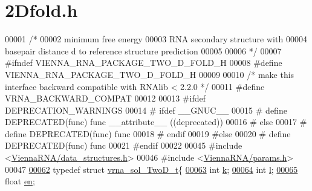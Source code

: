 \hypertarget{2Dfold_8h_source}{}\section{2\+Dfold.h}
\label{2Dfold_8h_source}

\begin{DoxyCode}
00001 \textcolor{comment}{/*}
00002 \textcolor{comment}{      minimum free energy}
00003 \textcolor{comment}{      RNA secondary structure with}
00004 \textcolor{comment}{      basepair distance d to reference structure prediction}
00005 \textcolor{comment}{}
00006 \textcolor{comment}{*/}
00007 \textcolor{preprocessor}{#ifndef VIENNA\_RNA\_PACKAGE\_TWO\_D\_FOLD\_H}
00008 \textcolor{preprocessor}{#define VIENNA\_RNA\_PACKAGE\_TWO\_D\_FOLD\_H}
00009 
00010 \textcolor{comment}{/* make this interface backward compatible with RNAlib < 2.2.0 */}
00011 \textcolor{preprocessor}{#define VRNA\_BACKWARD\_COMPAT}
00012 
00013 \textcolor{preprocessor}{#ifdef DEPRECATION\_WARNINGS}
00014 \textcolor{preprocessor}{# ifdef \_\_GNUC\_\_}
00015 \textcolor{preprocessor}{#  define DEPRECATED(func) func \_\_attribute\_\_ ((deprecated))}
00016 \textcolor{preprocessor}{# else}
00017 \textcolor{preprocessor}{#  define DEPRECATED(func) func}
00018 \textcolor{preprocessor}{# endif}
00019 \textcolor{preprocessor}{#else}
00020 \textcolor{preprocessor}{# define DEPRECATED(func) func}
00021 \textcolor{preprocessor}{#endif}
00022 
00045 \textcolor{preprocessor}{#include <\hyperlink{data__structures_8h}{ViennaRNA/data\_structures.h}>}
00046 \textcolor{preprocessor}{#include <\hyperlink{params_8h}{ViennaRNA/params.h}>}
00047 
\hypertarget{2Dfold_8h_source_l00062}{}\hyperlink{group__kl__neighborhood__mfe}{00062} \textcolor{keyword}{typedef} \textcolor{keyword}{struct }\hyperlink{group__kl__neighborhood__mfe_structvrna__sol__TwoD__t}{vrna\_sol\_TwoD\_t}\{
\hypertarget{2Dfold_8h_source_l00063}{}\hyperlink{group__kl__neighborhood__mfe_ac111e850bb3b3a11b6b5707912cfa1b8}{00063}   \textcolor{keywordtype}{int} \hyperlink{group__kl__neighborhood__mfe_ac111e850bb3b3a11b6b5707912cfa1b8}{k};          
\hypertarget{2Dfold_8h_source_l00064}{}\hyperlink{group__kl__neighborhood__mfe_ab8e95cd920901175a2cc8de726ab1d36}{00064}   \textcolor{keywordtype}{int} \hyperlink{group__kl__neighborhood__mfe_ab8e95cd920901175a2cc8de726ab1d36}{l};          
\hypertarget{2Dfold_8h_source_l00065}{}\hyperlink{group__kl__neighborhood__mfe_a7577863a6a84224dfee39b321c03cab1}{00065}   \textcolor{keywordtype}{float} \hyperlink{group__kl__neighborhood__mfe_a7577863a6a84224dfee39b321c03cab1}{en};       

\end{DoxyCode}
